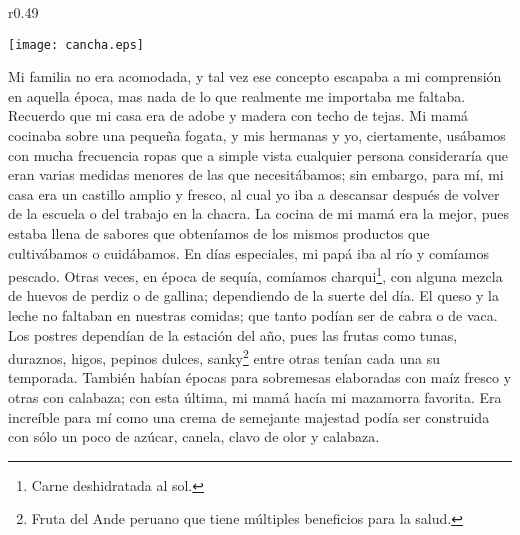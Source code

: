 \ifdefined\EnableIncludeImages
\begin{wrapfigure}{r}{0.49\textwidth}
  \begin{center}
  \vspace{-20pt}
    \texttt{[image: cancha.eps]}
  \end{center}
  \vspace{-20pt}
\end{wrapfigure}
\fi
Mi familia no era acomodada, y tal vez ese concepto escapaba a mi comprensión en aquella época, mas nada de lo que realmente me importaba me faltaba.   
Recuerdo que mi casa era de adobe y madera con techo de tejas. Mi mamá cocinaba sobre una pequeña fogata, y mis hermanas y yo, ciertamente, usábamos con mucha frecuencia ropas que a simple vista cualquier persona consideraría que eran varias medidas menores de las que necesitábamos;
sin embargo, para mí, mi casa era un castillo amplio y fresco, al cual yo iba a descansar después de volver de la escuela o del trabajo en la chacra.
La cocina de mi mamá era la mejor, pues estaba llena de sabores que obteníamos de los mismos productos que cultivábamos o cuidábamos. 
En días especiales, mi papá iba al río y comíamos pescado. Otras veces, en época de sequía, comíamos charqui\footnote{Carne deshidratada al sol.}, con alguna mezcla de huevos de perdiz o de gallina; dependiendo de la suerte del día.
El queso y la leche no faltaban en nuestras comidas; que tanto podían ser de cabra o de vaca.
Los postres dependían de la estación del año, pues las frutas como tunas, duraznos, higos, pepinos dulces, sanky\footnote{Fruta del Ande peruano que tiene múltiples beneficios para la salud.} entre otras tenían cada una su temporada. También habían épocas para sobremesas elaboradas con maíz fresco y otras con calabaza; con esta última, mi mamá hacía mi mazamorra favorita. Era increíble para mí como una crema de semejante majestad podía ser construida con sólo un poco de azúcar, canela, clavo de olor y calabaza.

